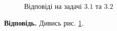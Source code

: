 \documentclass[12pt]{extarticle}
\begin{document}
\begin{figure}[H]
    \centering
    \qquad
    \caption{Відповіді на задачі $3.1$ та $3.2$}%
    \label{fig:3}%
\end{figure}

\textbf{Відповідь.} Дивись рис. \ref{fig:3}.
\end{document}
